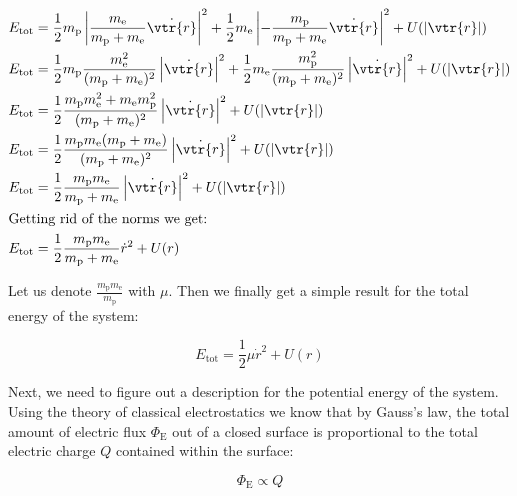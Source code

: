 \documentclass{article}
\begin{document}
    \begin{align}
        E_{\mathrm{tot}} &= \frac{1}{2}m_{\mathrm{p}}\left| \frac{m_{\mathrm{e}}}{m_{\mathrm{p}} + m_{\mathrm{e}}}\dot{\vtr{r}} \right|^2
        + \frac{1}{2}m_{\mathrm{e}}\left| -\frac{m_{\mathrm{p}}}{m_{\mathrm{p}} + m_{\mathrm{e}}}\dot{\vtr{r}} \right|^2 + U(\left| \vtr{r}\right|) \\
        E_{\mathrm{tot}} &= \frac{1}{2}m_{\mathrm{p}}\frac{m_{\mathrm{e}}^2}{(m_{\mathrm{p}} + m_{\mathrm{e}})^2}\left|\dot{\vtr{r}} \right|^2
        + \frac{1}{2}m_{\mathrm{e}}\frac{m_{\mathrm{p}}^2}{(m_{\mathrm{p}} + m_{\mathrm{e}})^2}\left|\dot{\vtr{r}} \right|^2 + U(\left| \vtr{r}\right|) \\
        E_{\mathrm{tot}} &= \frac{1}{2}\frac{m_{\mathrm{p}}m_{\mathrm{e}}^2 + m_{\mathrm{e}}m_{\mathrm{p}}^2}{(m_{\mathrm{p}} + m_{\mathrm{e}})^2}\left|\dot{\vtr{r}} \right|^2
        + U(\left| \vtr{r}\right|) \\
        E_{\mathrm{tot}} &= \frac{1}{2}\frac{m_{\mathrm{p}}m_{\mathrm{e}}(m_{\mathrm{p}} + m_{\mathrm{e}})}{(m_{\mathrm{p}} + m_{\mathrm{e}})^2}\left|\dot{\vtr{r}} \right|^2
        + U(\left| \vtr{r}\right|) \\
        E_{\mathrm{tot}} &= \frac{1}{2}\frac{m_{\mathrm{p}}m_{\mathrm{e}}}{m_{\mathrm{p}} + m_{\mathrm{e}}}\left|\dot{\vtr{r}} \right|^2 + U(\left| \vtr{r}\right|) \\
        \intertext{Getting rid of the norms we get:}
        E_{\mathrm{tot}} &= \frac{1}{2}\frac{m_{\mathrm{p}}m_{\mathrm{e}}}{m_{\mathrm{p}} + m_{\mathrm{e}}}\dot{r}^2 + U(r)
    \end{align}

    Let us denote $\frac{m_{\mathrm{p}}m_{\mathrm{e}}}{m_{\mathrm{p}}}$ with $\mu$. Then we finally get a simple result for the total energy of the system:

    \begin{equation}
        \label{eq:toten}
        \boxed{E_{\mathrm{tot}} = \frac{1}{2}\mu\dot{r}^2 + U(r)}
    \end{equation}

    Next, we need to figure out a description for the potential energy of the system. Using the theory of classical electrostatics we know that by Gauss's law, the total amount of
    electric flux $\Phi_{\mathrm{E}}$ out of a closed surface is proportional to the total electric charge $Q$ contained within the surface:

    \begin{equation}
        \Phi_{\mathrm{E}} \propto Q 
    \end{equation}
\end{document}
